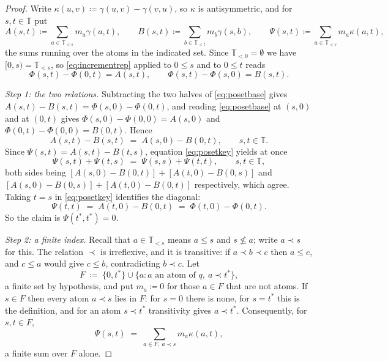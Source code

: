\documentclass[11pt,a4paper]{article}
\theoremstyle{plain}
\theoremstyle{definition}
\theoremstyle{remark}
\newcommand{\T}{\mathbb{T}}                     %
\begin{document}
\begin{proof}
  Write $\kappa(u,v) \coloneqq \gamma(u,v) - \gamma(v,u)$, so $\kappa$ is
  antisymmetric, and for $s,t \in \T$ put
  \[
    A(s,t) \coloneqq \!\!\sum_{a \in \T_{<s}}\!\! m_a \gamma(a,t) ,
    \qquad
    B(s,t) \coloneqq \!\!\sum_{b \in \T_{<t}}\!\! m_b \gamma(s,b) ,
    \qquad
    \Psi(s,t) \coloneqq \!\!\sum_{a \in \T_{<s}}\!\! m_a \kappa(a,t) ,
  \]
  the sums running over the atoms in the indicated set.  Since $\T_{<0}
  = \emptyset$ we have $[0,s) = \T_{<s}$, so \eqref{eq:incrementrep} applied to
  $0 \leq s$ and to $0 \leq t$ reads
  \begin{equation}
    \label{eq:posetbase}
    \Phi(s,t) - \Phi(0,t) = A(s,t) ,
    \qquad
    \Phi(s,t) - \Phi(s,0) = B(s,t) .
  \end{equation}

  \emph{Step 1: the two relations.}  Subtracting the two halves of
  \eqref{eq:posetbase} gives $A(s,t) - B(s,t) = \Phi(s,0) - \Phi(0,t)$, and
  reading \eqref{eq:posetbase} at $(s,0)$ and at $(0,t)$ gives
  $\Phi(s,0) - \Phi(0,0) = A(s,0)$ and $\Phi(0,t) - \Phi(0,0) = B(0,t)$.  Hence
  \begin{equation}
    \label{eq:posetkey}
    A(s,t) - B(s,t) \;=\; A(s,0) - B(0,t) ,
    \qquad s,t \in \T .
  \end{equation}
  Since $\Psi(s,t) = A(s,t) - B(t,s)$, equation \eqref{eq:posetkey} yields at
  once
  \begin{equation}
    \label{eq:posetdiamond}
    \Psi(s,t) + \Psi(t,s) \;=\; \Psi(s,s) + \Psi(t,t) ,
    \qquad s,t \in \T ,
  \end{equation}
  both sides being $[A(s,0) - B(0,t)] + [A(t,0) - B(0,s)]$ and
  $[A(s,0) - B(0,s)] + [A(t,0) - B(0,t)]$ respectively, which agree.  Taking
  $t = s$ in \eqref{eq:posetkey} identifies the diagonal:
  \begin{equation}
    \label{eq:posetdefect}
    \Psi(t,t) \;=\; A(t,0) - B(0,t) \;=\; \Phi(t,0) - \Phi(0,t) .
  \end{equation}
  So the claim is $\Psi(t^*,t^*) = 0$.

  \emph{Step 2: a finite index.}  Recall that $a \in \T_{<s}$ means $a \leq s$
  and $s \not\leq a$; write $a \prec s$ for this.  The relation $\prec$ is
  irreflexive, and it is transitive: if $a \prec b \prec c$ then $a \leq c$, and
  $c \leq a$ would give $c \leq b$, contradicting $b \prec c$.  Let
  \[
    F \;\coloneqq\; \{0, t^*\} \cup \{ a : a \text{ an atom of } q,\ a \prec t^* \} ,
  \]
  a finite set by hypothesis, and put $m_a \coloneqq 0$ for those $a \in F$ that
  are not atoms.  If $s \in F$ then every atom $a \prec s$ lies in $F$: for
  $s = 0$ there is none, for $s = t^*$ this is the definition, and for an atom
  $s \prec t^*$ transitivity gives $a \prec t^*$.  Consequently, for $s,t \in F$,
  \[
    \Psi(s,t) \;=\; \sum_{a \in F,\ a \prec s} m_a \kappa(a,t) ,
  \]
  a finite sum over $F$ alone.


\end{proof}
\end{document}
